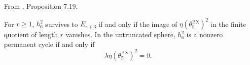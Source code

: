 \begin{theorem}
\label{sem:Literature:bx-survival}
From \cite{BurklundXu}, Proposition 7.19.\par

For $r\ge1$, $h_6^2$ survives to $E_{r+3}$ if and only if the image of $\eta(\theta_5^{\mathrm{BX}})^2$ in the finite quotient of length $r$ vanishes. In the untruncated sphere, $h_6^2$ is a nonzero permanent cycle if and only if
\[\lambda\eta(\theta_5^{\mathrm{BX}})^2=0.\]
\end{theorem}

